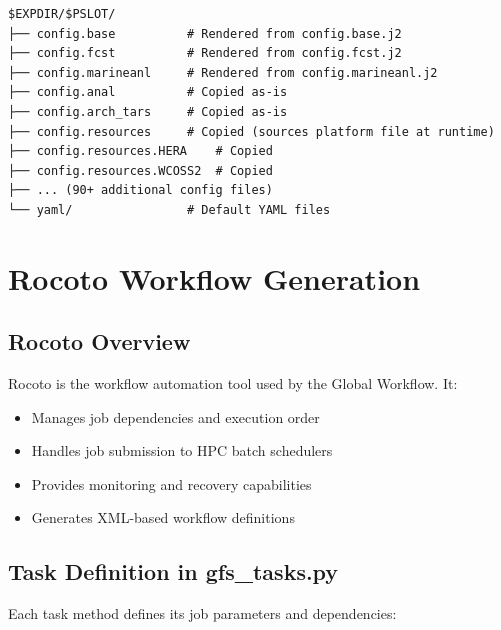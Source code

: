 \documentclass[11pt,letterpaper]{article}
\begin{document}
\begin{lstlisting}[style=bashstyle, title=Experiment Directory Contents]
$EXPDIR/$PSLOT/
├── config.base          # Rendered from config.base.j2
├── config.fcst          # Rendered from config.fcst.j2
├── config.marineanl     # Rendered from config.marineanl.j2
├── config.anal          # Copied as-is
├── config.arch_tars     # Copied as-is
├── config.resources     # Copied (sources platform file at runtime)
├── config.resources.HERA    # Copied
├── config.resources.WCOSS2  # Copied
├── ... (90+ additional config files)
└── yaml/                # Default YAML files
\end{lstlisting}


\section{Rocoto Workflow Generation}

\subsection{Rocoto Overview}

Rocoto is the workflow automation tool used by the Global Workflow. It:

\begin{itemize}
    \item Manages job dependencies and execution order
    \item Handles job submission to HPC batch schedulers
    \item Provides monitoring and recovery capabilities
    \item Generates XML-based workflow definitions
\end{itemize}

\subsection{Task Definition in gfs\_tasks.py}

Each task method defines its job parameters and dependencies:
\end{document}

